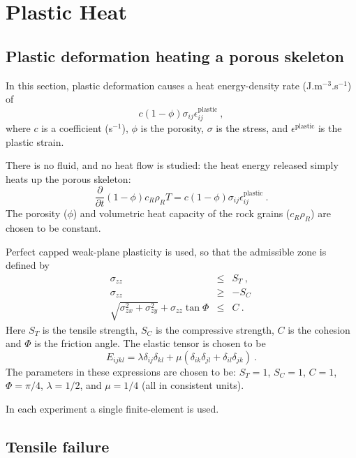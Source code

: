 \chapter{Plastic Heat}
\section{Plastic deformation heating a porous skeleton}

In this section, plastic deformation causes a heat energy-density rate
(J.m$^{-3}$.s$^{-1}$) of
\begin{equation}
c (1-\phi) \sigma_{ij}\epsilon^{\mathrm{plastic}}_{ij} \ ,
\end{equation}
where $c$ is a coefficient (s$^{-1}$), $\phi$ is the porosity,
$\sigma$ is the stress, and $\epsilon^{\mathrm{plastic}}$ is the
plastic strain.

There is no fluid, and no heat flow is studied: the heat energy
released simply heats up the porous skeleton:
\begin{equation}
\frac{\partial}{\partial t} (1 - \phi)c_{R}\rho_{R} T = c (1-\phi)
\sigma_{ij}\epsilon^{\mathrm{plastic}}_{ij} \ .
\end{equation}
The porosity ($\phi$) and volumetric heat
capacity of the rock grains ($c_{R}\rho_{R}$) are chosen to be constant.

Perfect capped weak-plane plasticity is used, so that the admissible
zone is defined by
\begin{eqnarray}
\sigma_{zz} & \leq & S_{T} \ , \\
\sigma_{zz} & \geq & -S_{C} \, \\
\sqrt{\sigma_{zx}^{2} + \sigma_{zy}^{2}} + \sigma_{zz}\tan\Phi & \leq
& C \ .
\end{eqnarray}
Here $S_{T}$ is the tensile strength, $S_{C}$ is the compressive
strength, $C$ is the cohesion and $\Phi$ is the friction angle.  The
elastic tensor is chosen to be
\begin{equation}
E_{ijkl} = \lambda \delta_{ij}\delta_{kl} + \mu
(\delta_{ik}\delta_{jl} + \delta_{il}\delta_{jk}) \ .
\end{equation}
The parameters in these expressions are chosen to be: $S_{T}=1$,
$S_{C}=1$, $C=1$, $\Phi=\pi/4$, $\lambda=1/2$, and $\mu=1/4$ (all in
consistent units).

In each experiment a single finite-element is used.

\section{Tensile failure}

